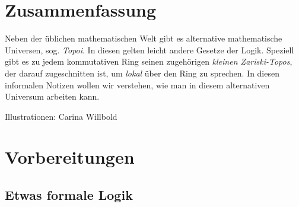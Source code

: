 \documentclass[a4paper,ngerman,12pt]{scrartcl}
\theoremstyle{definition}
\theoremstyle{plain}
\theoremstyle{remark}
\renewcommand{\_}{\mathpunct{.}\,}
\newcommand{\?}{\,{:}\,}
\begin{document}
\newpage

\section*{Zusammenfassung}
Neben der üblichen mathematischen Welt gibt es alternative mathematische
Universen, sog. \emph{Topoi}. In diesen gelten leicht andere Gesetze der Logik.
Speziell gibt es zu jedem kommutativen Ring seinen zugehörigen \emph{kleinen
Zariski-Topos}, der darauf zugeschnitten ist, um \emph{lokal} über den Ring zu
sprechen. In diesen informalen Notizen wollen wir verstehen, wie man in diesem
alternativen Universum arbeiten kann.

Illustrationen: Carina Willbold

\tableofcontents

\newpage

\section{Vorbereitungen}

\subsection{Etwas formale Logik}
\end{document}
